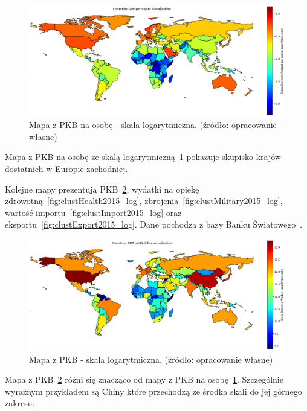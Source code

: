 \documentclass[11pt]{report}
\begin{document}
    \begin{figure}[!htp]
        \centering
        \includegraphics[width=\linewidth]{fig/CLUST/gdp_log.png}
        \caption{Mapa z PKB na osobę - skala logarytmiczna. (źródło: opracowanie własne)}
        \label{fig:clustGDP_log}
    \end{figure}
    Mapa z PKB na osobę ze skalą logarytmiczną~\ref{fig:clustGDP_log} pokazuje skupisko krajów dostatnich w Europie zachodniej.

    Kolejne mapy prezentują PKB~\ref{fig:clustGDP2015_log}, wydatki na opiekę zdrowotną~\ref{fig:clustHealth2015_log}, zbrojenia~\ref{fig:clustMilitary2015_log}, wartość importu~\ref{fig:clustImport2015_log} oraz eksportu~\ref{fig:clustExport2015_log}.
    Dane pochodzą z bazy Banku Światowego~\cite{worldbank}.

    \begin{figure}[!htp]
        \centering
        \includegraphics[width=\linewidth]{fig/CLUST/gdp2015.png}
        \caption{Mapa z PKB - skala logarytmiczna. (źródło: opracowanie własne)}
        \label{fig:clustGDP2015_log}
    \end{figure}
    Mapa z PKB~\ref{fig:clustGDP2015_log} różni się znacząco od mapy z PKB na osobę~\ref{fig:clustGDP_log}.
    Szczególnie wyraźnym przykładem są Chiny które przechodzą ze środka skali do jej górnego zakresu.
\end{document}
